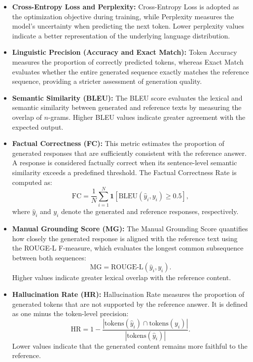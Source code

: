 \documentclass{ieeeaccess}
\begin{document}
\begin{itemize}
    \item \textbf{Cross-Entropy Loss and Perplexity:} Cross-Entropy Loss is adopted as the optimization objective during training, while Perplexity measures the model's uncertainty when predicting the next token. Lower perplexity values indicate a better representation of the underlying language distribution.

    \item \textbf{Linguistic Precision (Accuracy and Exact Match):} Token Accuracy measures the proportion of correctly predicted tokens, whereas Exact Match evaluates whether the entire generated sequence exactly matches the reference sequence, providing a stricter assessment of generation quality.

    \item \textbf{Semantic Similarity (BLEU):} The BLEU score evaluates the lexical and semantic similarity between generated and reference texts by measuring the overlap of $n$-grams. Higher BLEU values indicate greater agreement with the expected output.

    \item \textbf{Factual Correctness (FC):} This metric estimates the proportion of generated responses that are sufficiently consistent with the reference answer. A response is considered factually correct when its sentence-level semantic similarity exceeds a predefined threshold. The Factual Correctness Rate is computed as:
    \begin{equation}
    \text{FC} = \frac{1}{N}\sum_{i=1}^{N}\mathbf{1}\!\left[\text{BLEU}(\hat{y}_i,y_i)\geq0.5\right],
    \end{equation}
    where $\hat{y}_i$ and $y_i$ denote the generated and reference responses, respectively.

    \item \textbf{Manual Grounding Score (MG):} The Manual Grounding Score quantifies how closely the generated response is aligned with the reference text using the ROUGE-L F-measure, which evaluates the longest common subsequence between both sequences:
    \begin{equation}
    \text{MG}=\text{ROUGE-L}(\hat{y}_i,y_i).
    \end{equation}
    Higher values indicate greater lexical overlap with the reference content.

    \item \textbf{Hallucination Rate (HR):} Hallucination Rate measures the proportion of generated tokens that are not supported by the reference answer. It is defined as one minus the token-level precision:
    \begin{equation}
    \text{HR}=1-\frac{|\text{tokens}(\hat{y}_i)\cap\text{tokens}(y_i)|}{|\text{tokens}(\hat{y}_i)|}.
    \end{equation}
    Lower values indicate that the generated content remains more faithful to the reference.


\end{itemize}
\end{document}
